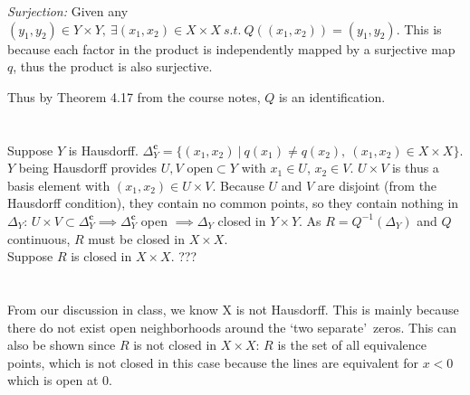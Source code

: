 \documentclass{jhwhw}
\begin{document}
 \textit{Surjection:} Given any $(y_1,y_2) \in Y\times Y,\ \exists (x_1,x_2)\in X\times X\ s.t.\ Q((x_1,x_2))=(y_1,y_2)$. This is because each factor in the product is independently mapped by a surjective map $q$, thus the product is also surjective.

Thus by Theorem 4.17 from the course notes, $Q$ is an identification.

\part{}%
\noindent Suppose $Y$ is Hausdorff. $\Delta_Y^{\mathbf{c}}=\{(x_1,x_2)\ | \ q(x_1)\ne q(x_2),\ (x_1,x_2)\in X\times X\}$. $Y$ being Hausdorff provides $U,V\text{ open}\subset Y$ with $x_1\in U$, $x_2\in V$. $U\times V$ is thus a basis element with $(x_1,x_2) \in U\times V$. Because $U$ and $V$ are disjoint (from the Hausdorff condition), they contain no common points, so they contain nothing in $\Delta_Y$: $U\times V \subset \Delta_Y^{\mathbf{c}}\implies \Delta_Y^{\mathbf{c}}$ open $\implies \Delta_Y$ closed in $Y\times Y$. As $R = Q^{-1}(\Delta_Y)$ and $Q$ continuous, $R$ must be closed in $X\times X$.
\\

\noindent
Suppose $R$ is closed in $X\times X$.  ???

\part{}%
\noindent From our discussion in class, we know X is not Hausdorff. This is mainly because there do not exist open neighborhoods around the \lq two separate\rq\ zeros. This can also be shown since $R$ is not closed in $X\times X$: $R$ is the set of all equivalence points, which is not closed in this case because the lines are equivalent for $x<0$ which is open at 0.
\end{document}
